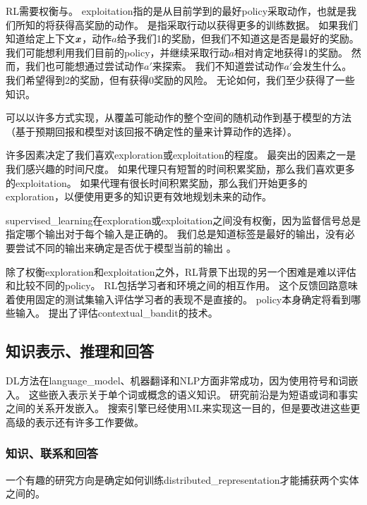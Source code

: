 
\gls{RL}需要权衡与。
\gls{exploitation}指的是从目前学到的最好\gls{policy}采取动作，也就是我们所知的将获得高奖励的动作。
是指采取行动以获得更多的训练数据。
如果我们知道给定上下文$\boldsymbol{\mathit{x}}$，动作$a$给予我们1的奖励，但我们不知道这是否是最好的奖励。
我们可能想利用我们目前的\gls{policy}，并继续采取行动$a$相对肯定地获得1的奖励。
然而，我们也可能想通过尝试动作$a'$来探索。
我们不知道尝试动作$a'$会发生什么。
我们希望得到2的奖励，但有获得0奖励的风险。
无论如何，我们至少获得了一些知识。

可以以许多方式实现，从覆盖可能动作的整个空间的随机动作到基于模型的方法（基于预期回报和模型对该回报不确定性的量来计算动作的选择）。

许多因素决定了我们喜欢\gls{exploration}或\gls{exploitation}的程度。
最突出的因素之一是我们感兴趣的时间尺度。
如果代理只有短暂的时间积累奖励，那么我们喜欢更多的\gls{exploitation}。
如果代理有很长时间积累奖励，那么我们开始更多的\gls{exploration}，以便使用更多的知识更有效地规划未来的动作。

\gls{supervised_learning}在\gls{exploration}或\gls{exploitation}之间没有权衡，因为监督信号总是指定哪个输出对于每个输入是正确的。
我们总是知道标签是最好的输出，没有必要尝试不同的输出来确定是否优于模型当前的输出 。

除了权衡\gls{exploration}和\gls{exploitation}之外，\gls{RL}背景下出现的另一个困难是难以评估和比较不同的\gls{policy}。
\gls{RL}包括学习者和环境之间的相互作用。
这个反馈回路意味着使用固定的测试集输入评估学习者的表现不是直接的。
\gls{policy}本身确定将看到哪些输入。
\citet{Dudik-2011} 提出了评估\gls{contextual_bandit}的技术。


\subsection{知识表示、推理和回答}
\label{sec:knowledge_representation_reasoning and_question_answering}
\gls{DL}方法在\gls{language_model}、机器翻译和\gls{NLP}方面非常成功，因为使用符号\citep{Rumelhart86b-small}和词嵌入\citep{Deerwester90,BenDucVin01-small}。 
这些嵌入表示关于单个词或概念的语义知识。
研究前沿是为短语或词和事实之间的关系开发嵌入。
搜索引擎已经使用\gls{ML}来实现这一目的，但是要改进这些更高级的表示还有许多工作要做。

\subsubsection{知识、联系和回答}
一个有趣的研究方向是确定如何训练\gls{distributed_representation}才能捕获两个实体之间的。

